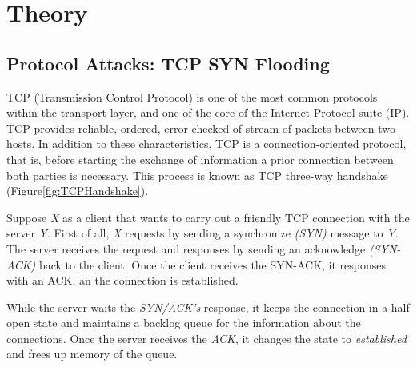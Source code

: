 

\chapter{Theory}
\label{chapter:theory}

\section{Protocol Attacks: TCP SYN Flooding}

TCP (Transmission Control Protocol) is one of the most common protocols within the transport layer, and one of the core of the Internet Protocol suite (IP). TCP provides reliable, ordered, error-checked of stream of packets between two hosts. In addition to these characteristics, TCP is a connection-oriented protocol, that is, before starting the exchange of information a prior connection between both parties is necessary. This process is known as TCP three-way handshake (Figure\ref{fig:TCPHandshake}).

\par

Suppose \textit{X} as a client that wants to carry out a friendly TCP connection with the server \textit{Y}. First of all, \textit{X} requests by sending a synchronize \textit{(SYN)} message to \textit{Y}. The server receives the request and responses by sending an acknowledge \textit{(SYN-ACK)} back to the client. Once the client receives the SYN-ACK, it responses with an ACK, an the connection is established. 

\par

While the server waits the \textit{SYN/ACK's} response, it keeps the connection in a half open state and maintains a backlog queue for the information about the connections. Once the server receives the \textit{ACK}, it changes the state to \textit{established} and frees up memory of the queue.

\par



